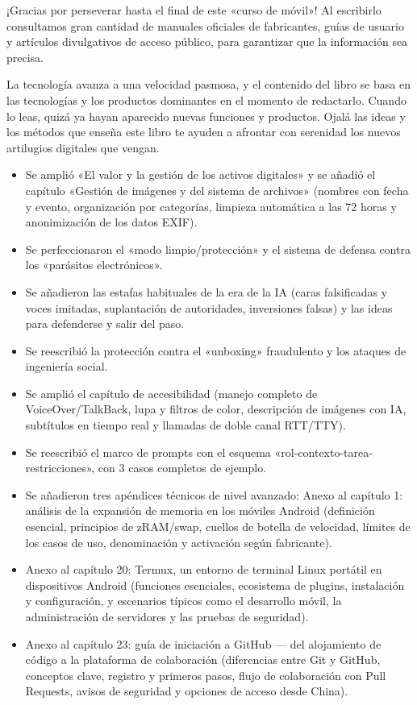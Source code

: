 
¡Gracias por perseverar hasta el final de este «curso de móvil»! Al escribirlo consultamos gran cantidad de manuales oficiales de fabricantes, guías de usuario y artículos divulgativos de acceso público, para garantizar que la información sea precisa.

La tecnología avanza a una velocidad pasmosa, y el contenido del libro se basa en las tecnologías y los productos dominantes en el momento de redactarlo. Cuando lo leas, quizá ya hayan aparecido nuevas funciones y productos. Ojalá las ideas y los métodos que enseña este libro te ayuden a afrontar con serenidad los nuevos artilugios digitales que vengan.


\begin{itemize}
  \item Se amplió «El valor y la gestión de los activos digitales» y se añadió el capítulo «Gestión de imágenes y del sistema de archivos» (nombres con fecha y evento, organización por categorías, limpieza automática a las 72 horas y anonimización de los datos EXIF).
  \item Se perfeccionaron el «modo limpio/protección» y el sistema de defensa contra los «parásitos electrónicos».
  \item Se añadieron las estafas habituales de la era de la IA (caras falsificadas y voces imitadas, suplantación de autoridades, inversiones falsas) y las ideas para defenderse y salir del paso.
  \item Se reescribió la protección contra el «unboxing» fraudulento y los ataques de ingeniería social.
  \item Se amplió el capítulo de accesibilidad (manejo completo de VoiceOver/TalkBack, lupa y filtros de color, descripción de imágenes con IA, subtítulos en tiempo real y llamadas de doble canal RTT/TTY).
  \item Se reescribió el marco de prompts con el esquema «rol-contexto-tarea-restricciones», con 3 casos completos de ejemplo.
  \item Se añadieron tres apéndices técnicos de nivel avanzado: Anexo al capítulo 1: análisis de la expansión de memoria en los móviles Android (definición esencial, principios de zRAM/swap, cuellos de botella de velocidad, límites de los casos de uso, denominación y activación según fabricante).
  \item Anexo al capítulo 20: Termux, un entorno de terminal Linux portátil en dispositivos Android (funciones esenciales, ecosistema de plugins, instalación y configuración, y escenarios típicos como el desarrollo móvil, la administración de servidores y las pruebas de seguridad).
  \item Anexo al capítulo 23: guía de iniciación a GitHub — del alojamiento de código a la plataforma de colaboración (diferencias entre Git y GitHub, conceptos clave, registro y primeros pasos, flujo de colaboración con Pull Requests, avisos de seguridad y opciones de acceso desde China).
\end{itemize}


